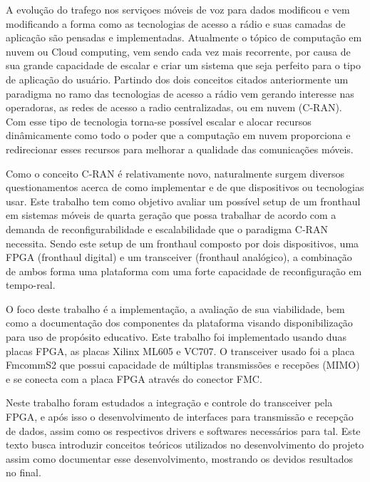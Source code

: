 \documentclass{ufpatcc}
\begin{document}
\begin{ufpaResumo}

A evolu\c{c}\~{a}o do trafego nos servi\c{c}oes m\'{o}veis de voz para dados
modificou e vem modificando a forma como as tecnologias de acesso a r\'{a}dio e
suas camadas de aplica\c{c}\~{a}o s\~{a}o pensadas e implementadas. Atualmente o
t\'{o}pico de computa\c{c}\~{a}o em nuvem ou Cloud computing, vem sendo cada vez
mais recorrente, por causa de sua grande capacidade de escalar e criar um
sistema que seja perfeito para o tipo de aplica\c{c}\~{a}o do usu\'{a}rio.
Partindo dos dois conceitos citados anteriormente um paradigma no ramo das
tecnologias de acesso a r\'{a}dio vem gerando interesse nas operadoras, as redes
de acesso a radio centralizadas, ou em nuvem (C-RAN). Com esse tipo de
tecnologia torna-se poss\'{i}vel escalar e alocar recursos din\^{a}micamente como
todo o poder que a computa\c{c}\~{a}o em nuvem proporciona e redirecionar esses
recursos para melhorar a qualidade das comunica\c{c}\~{o}es m\'{o}veis.

Como o conceito C-RAN \'{e} relativamente novo, naturalmente surgem diversos
questionamentos acerca de como implementar e de que dispositivos ou tecnologias
usar. Este trabalho tem como objetivo avaliar um poss\'{i}vel setup de um
fronthaul em sistemas m\'{o}veis de quarta gera\c{c}\~{a}o que possa trabalhar
de acordo com a demanda de reconfigurabilidade e escalabilidade que o paradigma
C-RAN necessita. Sendo este setup de um fronthaul composto por dois
dispositivos, uma FPGA (fronthaul digital) e um transceiver (fronthaul
anal\'{o}gico), a combina\c{c}\~{a}o de ambos forma uma plataforma com uma forte
capacidade de reconfigura\c{c}\~{a}o em tempo-real.

O foco deste trabalho \'{e} a implementa\c{c}\~{a}o, a avalia\c{c}\~{a}o de sua
viabilidade, bem como a documenta\c{c}\~{a}o dos componentes da plataforma
visando disponibiliza\c{c}\~{a}o para uso de prop\'{o}sito educativo. Este
trabalho foi implementado usando duas placas FPGA, as placas Xilinx ML605 e
VC707. O transceiver usado foi a placa FmcommS2 que possui capacidade de
m\'{u}ltiplas transmiss\~{o}es e recep\~{o}es (MIMO) e se conecta com a placa FPGA
atrav\'{e}s do conector FMC.

Neste trabalho foram estudados a integra\c{c}\~{a}o e controle do transceiver
pela FPGA, e ap\'{o}s isso o desenvolvimento de interfaces para transmiss\~{a}o
e recep\c{c}\~{a}o de dados, assim como os respectivos drivers e softwares
necess\'{a}rios para tal. Este texto busca introduzir conceitos te\'{o}ricos
utilizados no desenvolvimento do projeto assim como documentar esse
desenvolvimento, mostrando os devidos resultados no final.

\end{ufpaResumo}
\end{document}
